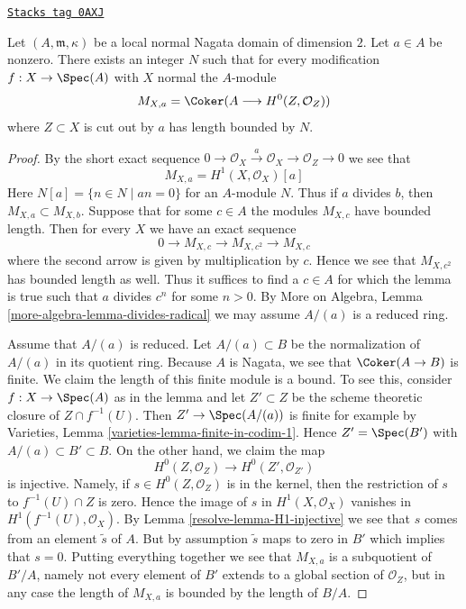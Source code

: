 \begin{lemma}
\label{resolve-lemma-bound-a-torsion}
\href{https://stacks.math.columbia.edu/tag/0AXJ}{\texttt{Stacks tag 0AXJ}}

Let $(A, \mathfrak m, \kappa)$ be a local normal Nagata domain
of dimension $2$. Let $a \in A$ be nonzero. There exists an integer $N$ such
that for every modification $f : X \to \Spec(A)$ with $X$ normal the
$A$-module
$$
M_{X, a} = \Coker(A \longrightarrow H^0(Z, \mathcal{O}_Z))
$$
where $Z \subset X$ is cut out by $a$ has length bounded by $N$.
\end{lemma}

\begin{proof}

By the short exact sequence
$
0 \to \mathcal{O}_X \xrightarrow{a} \mathcal{O}_X \to \mathcal{O}_Z \to 0
$
we see that
\begin{equation}
\label{equation-a-torsion}
M_{X, a} = H^1(X, \mathcal{O}_X)[a]
\end{equation}
Here $N[a] = \{n \in N \mid an = 0\}$ for an $A$-module $N$. Thus
if $a$ divides $b$, then $M_{X, a} \subset M_{X, b}$.
Suppose that for some $c \in A$ the modules $M_{X, c}$
have bounded length. Then for every $X$ we have an exact sequence
$$
0 \to M_{X, c} \to M_{X, c^2} \to M_{X, c}
$$
where the second arrow is given by multiplication by $c$. Hence we see that
$M_{X, c^2}$ has bounded length as well. Thus it suffices to find a $c \in A$
for which the lemma is true such that $a$ divides $c^n$ for some $n > 0$.
By More on Algebra, Lemma \ref{more-algebra-lemma-divides-radical}
we may assume $A/(a)$ is a reduced ring.

\medskip\noindent
Assume that $A/(a)$ is reduced. Let $A/(a) \subset B$ be the normalization
of $A/(a)$ in its quotient ring. Because $A$ is Nagata, we see that
$\Coker(A \to B)$ is finite. We claim the length of this finite
module is a bound. To see this, consider $f : X \to \Spec(A)$ as in the lemma
and let $Z' \subset Z$ be the scheme theoretic closure of $Z \cap f^{-1}(U)$.
Then $Z' \to \Spec(A/(a))$ is finite for example by Varieties, Lemma
\ref{varieties-lemma-finite-in-codim-1}.
Hence $Z' = \Spec(B')$ with $A/(a) \subset B' \subset B$.
On the other hand, we claim the map
$$
H^0(Z, \mathcal{O}_Z) \to H^0(Z', \mathcal{O}_{Z'})
$$
is injective. Namely, if $s \in H^0(Z, \mathcal{O}_Z)$
is in the kernel, then
the restriction of $s$ to $f^{-1}(U) \cap Z$ is zero.
Hence the image of $s$ in $H^1(X, \mathcal{O}_X)$ vanishes in
$H^1(f^{-1}(U), \mathcal{O}_X)$. By Lemma \ref{resolve-lemma-H1-injective}
we see that $s$ comes from an element $\tilde s$ of $A$. But by
assumption $\tilde s$ maps to zero in $B'$ which implies that $s = 0$.
Putting everything together we see that
$M_{X, a}$ is a subquotient of $B'/A$, namely not every element
of $B'$ extends to a global section of $\mathcal{O}_Z$, but in
any case the length of $M_{X, a}$ is bounded by the length of $B/A$.
\end{proof}

